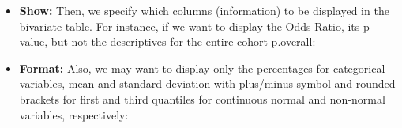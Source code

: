 \documentclass[11pt]{article}
\begin{document}
\begin{itemize}
\begin{itemize}
	\item {\bf Show:} Then, we specify which columns (information) to be displayed in the bivariate table. For instance, if we want to display the Odds Ratio, its p-value, but not the descriptives for the entire cohort p.overall:	
\begin{center}
\end{center}

    \vspace{0.5cm}
	\item {\bf Format:} Also, we may want to display only the percentages for categorical variables, mean and standard deviation with plus/minus symbol and rounded brackets for first and third quantiles for continuous normal and non-normal variables, respectively:
\begin{center}
\end{center}	


\end{itemize}
\end{itemize}
\end{document}

